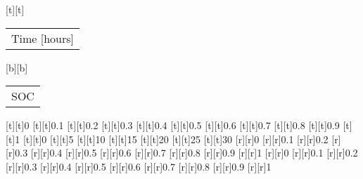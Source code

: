 %
%
[t][t]{\color[rgb]{0,0,0}\setlength{\tabcolsep}{0pt}\begin{tabular}{c}Time [hours]\end{tabular}}%
[b][b]{\color[rgb]{0,0,0}\setlength{\tabcolsep}{0pt}\begin{tabular}{c}SOC\end{tabular}}%
%
[t][t]{0}%
[t][t]{0.1}%
[t][t]{0.2}%
[t][t]{0.3}%
[t][t]{0.4}%
[t][t]{0.5}%
[t][t]{0.6}%
[t][t]{0.7}%
[t][t]{0.8}%
[t][t]{0.9}%
[t][t]{1}%
[t][t]{0}%
[t][t]{5}%
[t][t]{10}%
[t][t]{15}%
[t][t]{20}%
[t][t]{25}%
[t][t]{30}%
%
[r][r]{0}%
[r][r]{0.1}%
[r][r]{0.2}%
[r][r]{0.3}%
[r][r]{0.4}%
[r][r]{0.5}%
[r][r]{0.6}%
[r][r]{0.7}%
[r][r]{0.8}%
[r][r]{0.9}%
[r][r]{1}%
[r][r]{0}%
[r][r]{0.1}%
[r][r]{0.2}%
[r][r]{0.3}%
[r][r]{0.4}%
[r][r]{0.5}%
[r][r]{0.6}%
[r][r]{0.7}%
[r][r]{0.8}%
[r][r]{0.9}%
[r][r]{1}%
%
%
